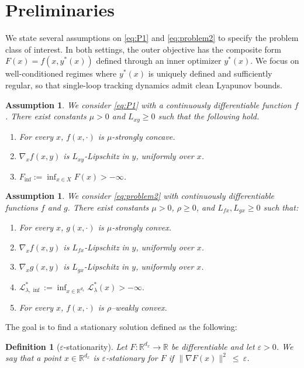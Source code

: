 \documentclass{article}
\newtheorem{definition}[theorem]{Definition}
\newtheorem{assumption}[theorem]{Assumption}
\newcommand{\1}{\mathbf{1}}
\begin{document}
\section{Preliminaries}
We state several assumptions on \ref{eq:P1} and \ref{eq:problem2} to specify the problem class of interest.
In both settings, the outer objective has the composite form $F(x)=f(x,y^*(x))$ defined through an inner optimizer $y^*(x)$.
We focus on well-conditioned regimes where $y^*(x)$ is uniquely defined and sufficiently regular, so that single-loop tracking dynamics admit clean Lyapunov bounds.
\begin{assumption}\label{ass:1}
We consider \ref{eq:P1} with a continuously differentiable function $f$. There exist constants $\mu>0$ and $L_{xy}\ge 0$ such that the following hold.
\begin{enumerate}%
  \item For every $x$, $f(x,\cdot)$ is $\mu$-strongly concave. 
  \item $\nabla_x f(x,y)$ is $L_{xy}$-Lipschitz in $y$, uniformly over $x$.
  \item $F_{\inf}:=\inf_{x\in X} F(x) > -\infty$.
\end{enumerate}
\end{assumption}

\begin{assumption}\label{ass:2}
We consider \ref{eq:problem2} with continuously differentiable functions $f$ and $g$.
There exist constants $\mu>0$, $\rho\ge 0$, and $L_{fx},L_{gx}\ge 0$ such that:
\begin{enumerate}%
  \item For every $x$, $g(x,\cdot)$ is $\mu$-strongly convex.
  \item $\nabla_x f(x,y)$ is $L_{fx}$-Lipschitz in $y$, uniformly over $x$.
  \item $\nabla_x g(x,y)$ is $L_{gx}$-Lipschitz in $y$, uniformly over $x$.
  \item $\mathcal{L}_{\lambda,\inf}^{*}:=\inf_{x\in\mathbb{R}^{d_x}} \mathcal L_\lambda^{*}(x) > -\infty.$
  \item For every $x$, $f(x,\cdot)$ is $\rho$--weakly convex.
\end{enumerate}
\end{assumption}

The goal is to find a stationary solution defined as the following:
\begin{definition}[$\varepsilon$-stationarity]\label{def:eps-stationary}
Let $F:\mathbb{R}^{d_x}\to\mathbb{R}$ be differentiable and let $\varepsilon>0$.
We say that a point $x\in\mathbb{R}^{d_x}$ is $\varepsilon$-stationary for $F$
if $\|\nabla F(x)\|^{2}\ \le\ \varepsilon$.
\end{definition}
\end{document}
